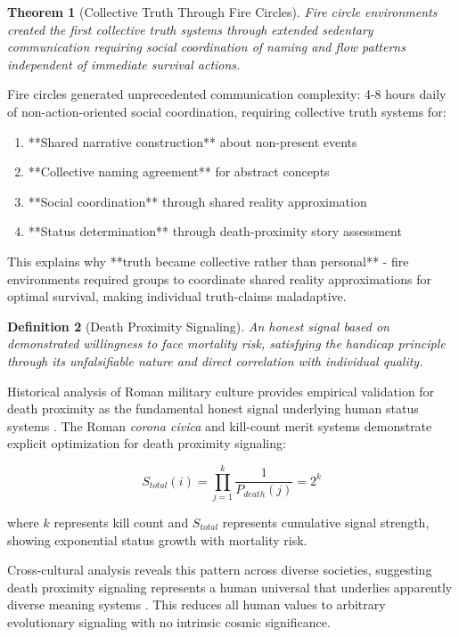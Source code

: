 \documentclass[12pt,a4paper]{article}
\newtheorem{theorem}{Theorem}[section]
\newtheorem{definition}[theorem]{Definition}
\begin{document}
\begin{theorem}[Collective Truth Through Fire Circles]
Fire circle environments created the first collective truth systems through extended sedentary communication requiring social coordination of naming and flow patterns independent of immediate survival actions.
\end{theorem}

Fire circles generated unprecedented communication complexity: 4-8 hours daily of non-action-oriented social coordination, requiring collective truth systems for:
\begin{enumerate}
\item **Shared narrative construction** about non-present events
\item **Collective naming agreement** for abstract concepts  
\item **Social coordination** through shared reality approximation
\item **Status determination** through death-proximity story assessment
\end{enumerate}

This explains why **truth became collective rather than personal** - fire environments required groups to coordinate shared reality approximations for optimal survival, making individual truth-claims maladaptive.

\begin{definition}[Death Proximity Signaling]
An honest signal based on demonstrated willingness to face mortality risk, satisfying the handicap principle \citep{zahavi1975mate} through its unfalsifiable nature and direct correlation with individual quality.
\end{definition}

Historical analysis of Roman military culture provides empirical validation for death proximity as the fundamental honest signal underlying human status systems \citep{sabin2000face}. The Roman \textit{corona civica} and kill-count merit systems demonstrate explicit optimization for death proximity signaling:

\begin{equation}
S_{total}(i) = \prod_{j=1}^{k} \frac{1}{P_{death}(j)} = 2^k
\end{equation}

where $k$ represents kill count and $S_{total}$ represents cumulative signal strength, showing exponential status growth with mortality risk.

Cross-cultural analysis reveals this pattern across diverse societies, suggesting death proximity signaling represents a human universal that underlies apparently diverse meaning systems \citep{brown1991human}. This reduces all human values to arbitrary evolutionary signaling with no intrinsic cosmic significance.
\end{document}
